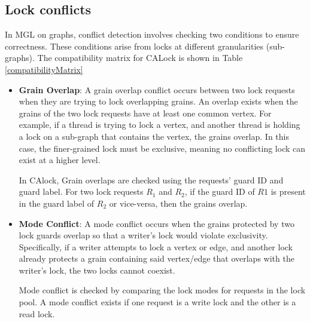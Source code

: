 
\subsection{Lock conflicts}



In MGL on graphs, conflict detection involves checking two conditions to ensure correctness. These conditions arise from locks at different granularities (sub-graphs). The compatibility matrix for CALock is shown in Table \ref{compatibilityMatrix}
\begin{itemize}
	\item \textbf{Grain Overlap}: A grain overlap conflict occurs between two lock requests when they are trying to lock overlapping grains. An overlap exists when the grains of the two lock requests have at least one common vertex. For example, if a thread is trying to lock a vertex, and another thread is holding a lock on a sub-graph that contains the vertex, the grains overlap. In this case, the finer-grained lock must be exclusive, meaning no conflicting lock can exist at a higher level.
	
	In CAlock, Grain overlaps are checked using the requests' guard ID and guard label. For two lock requests $R_1$ and $R_2$, if the guard ID of $R1$ is present in the guard label of $R_2$ or vice-versa, then the grains overlap.
	
	\item \textbf{Mode Conflict}: A mode conflict occurs when the grains protected by two lock guards overlap so that a writer’s lock would violate exclusivity. Specifically, if a writer attempts to lock a vertex or edge, and another lock already protects a grain containing said vertex/edge that overlaps with the writer’s lock, the two locks cannot coexist.
	
	Mode conflict is checked by comparing the lock modes for requests in the lock pool. A mode conflict exists if one request is a write lock and the other is a read lock.
\end{itemize}



